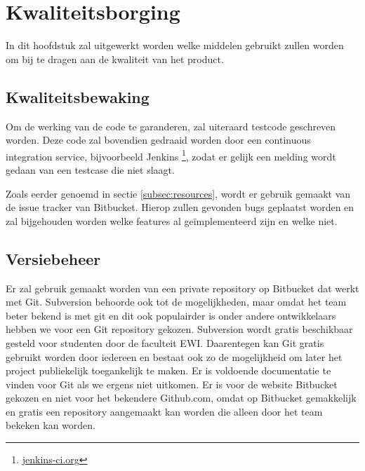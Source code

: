 \section{Kwaliteitsborging}
In dit hoofdstuk zal uitgewerkt worden welke middelen gebruikt zullen worden om bij te dragen aan de kwaliteit van het product.

\subsection{Kwaliteitsbewaking}
Om de werking van de code te garanderen, zal uiteraard testcode geschreven worden. Deze code zal bovendien gedraaid worden door een continuous integration service, bijvoorbeeld Jenkins \footnote{\url{jenkins-ci.org}}, zodat er gelijk een melding wordt gedaan van een testcase die niet slaagt.

Zoals eerder genoemd in sectie \ref{subsec:resources}, wordt er gebruik gemaakt van de issue tracker van Bitbucket. Hierop zullen gevonden bugs geplaatst worden en zal bijgehouden worden welke features al ge\"implementeerd zijn en welke niet.

\subsection{Versiebeheer}
Er zal gebruik gemaakt worden van een private repository op Bitbucket dat werkt met Git. Subversion behoorde ook tot de mogelijkheden, maar omdat het team beter bekend is met git en dit ook populairder is onder andere ontwikkelaars hebben we voor een Git repository gekozen. Subversion wordt gratis beschikbaar gesteld voor studenten door de faculteit EWI. Daarentegen kan Git gratis gebruikt worden door iedereen en bestaat ook zo de mogelijkheid om later het project publiekelijk toegankelijk te maken. Er is voldoende documentatie te vinden voor Git als we ergens niet uitkomen. Er is voor de website Bitbucket gekozen en niet voor het bekendere Github.com, omdat op Bitbucket gemakkelijk en gratis een repository aangemaakt kan worden die alleen door het team bekeken kan worden. 
